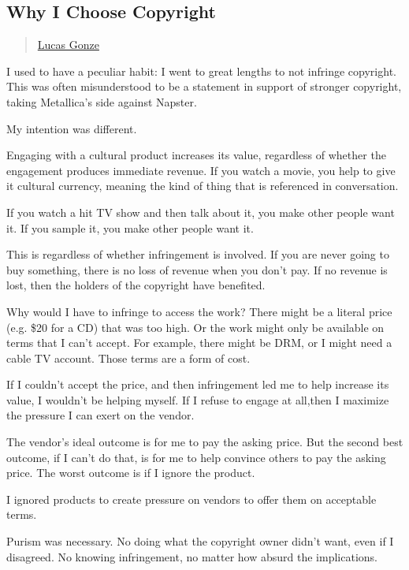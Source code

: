 \subsection{Why I Choose Copyright}\label{why-i-choose-copyright}

\begin{quote}
\href{../appendix/attributions.html\#lucas-gonze}{Lucas Gonze}
\end{quote}

I used to have a peculiar habit: I went to great lengths to not infringe
copyright. This was often misunderstood to be a statement in support of
stronger copyright, taking Metallica's side against Napster.

My intention was different.

Engaging with a cultural product increases its value, regardless of
whether the engagement produces immediate revenue. If you watch a movie,
you help to give it cultural currency, meaning the kind of thing that is
referenced in conversation.

If you watch a hit TV show and then talk about it, you make other people
want it. If you sample it, you make other people want it.

This is regardless of whether infringement is involved. If you are never
going to buy something, there is no loss of revenue when you don't pay.
If no revenue is lost, then the holders of the copyright have benefited.

Why would I have to infringe to access the work? There might be a
literal price (e.g. \$20 for a CD) that was too high. Or the work might
only be available on terms that I can't accept. For example, there might
be DRM, or I might need a cable TV account. Those terms are a form of
cost.

If I couldn't accept the price, and then infringement led me to help
increase its value, I wouldn't be helping myself. If I refuse to engage
at all,then I maximize the pressure I can exert on the vendor.

The vendor's ideal outcome is for me to pay the asking price. But the
second best outcome, if I can't do that, is for me to help convince
others to pay the asking price. The worst outcome is if I ignore the
product.

I ignored products to create pressure on vendors to offer them on
acceptable terms.

Purism was necessary. No doing what the copyright owner didn't want,
even if I disagreed. No knowing infringement, no matter how absurd the
implications.

